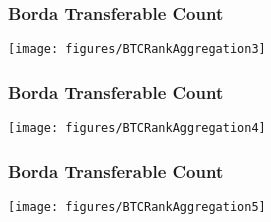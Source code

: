 \begin{frame}
	\frametitle{Borda Transferable Count}
	\centering
	\texttt{[image: figures/BTCRankAggregation3]}
\end{frame}

\begin{frame}
	\frametitle{Borda Transferable Count}
	\centering
	\texttt{[image: figures/BTCRankAggregation4]}
\end{frame}

\begin{frame}
	\frametitle{Borda Transferable Count}
	\centering
	\texttt{[image: figures/BTCRankAggregation5]}
\end{frame}